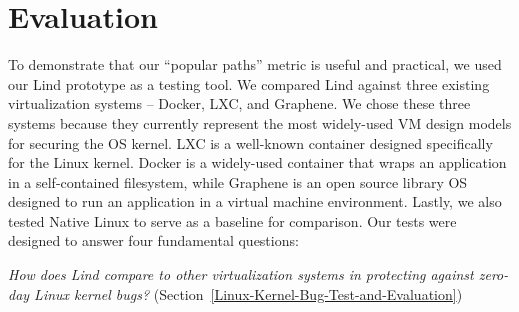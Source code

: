 \section{Evaluation}
\label{sec.evaluation}

To demonstrate that our ``popular paths'' metric is useful and practical,
we used our Lind prototype as a testing tool.
We compared Lind against three existing
virtualization systems -- Docker, LXC, and Graphene.
We chose these three systems because they currently represent the most
widely-used VM design models for securing the OS kernel.
LXC is a well-known container designed specifically for the Linux kernel.
Docker is a widely-used container that wraps an application in a self-contained filesystem, while
Graphene is an open source library OS designed to run an application in a virtual machine environment.
Lastly, we also tested Native Linux to serve as a
baseline for comparison.
%
Our tests were designed to answer four fundamental questions:

\textit{How does Lind compare to other virtualization systems
in protecting against zero-day Linux kernel bugs?}
(Section~{\ref{Linux-Kernel-Bug-Test-and-Evaluation}})


